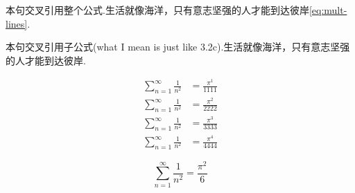 \documentclass[12pt]{ctexart}
\renewcommand{\theequation}{\arabic{section}.\arabic{equation}}
\begin{document}
    本句交叉引用整个公式.生活就像海洋，只有意志坚强的人才能到达彼岸\eqref{eq:mult-lines}.

    本句交叉引用子公式(what I mean is just like 3.2c).生活就像海洋，只有意志坚强的人才能到达彼岸.

    \lipsum[4]

    \begin{subequations}
    \renewcommand{\theequation}{\theparentequation-\roman{equation}-\alph{equation}-以及公式\textbf{编号}\chinese{equation}}
        \begin{align}
        \sum_{n=1}^{\infty} \frac{1}{n^2} &= \frac{\pi^1}{1111} \\
        \sum_{n=1}^{\infty} \frac{1}{n^2} &= \frac{\pi^2}{2222} \\
        \sum_{n=1}^{\infty} \frac{1}{n^2} &= \frac{\pi^3}{3333} \\
        \sum_{n=1}^{\infty} \frac{1}{n^2} &= \frac{\pi^4}{4444}
        \end{align}
        \label{eq:mult-lines-pro}
    \end{subequations}

    \lipsum[9]

    \begin{equation}
        \sum_{n=1}^{\infty} \frac{1}{n^2} = \frac{\pi^2}{6}
    \end{equation}
\end{document}
